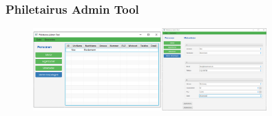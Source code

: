 \begin{frame}
\frametitle{Philetairus Admin Tool}

\begin{figure}
  \includegraphics[width=0.8\textwidth]{figures/phileadmin_workflow.png}
  \label{fig:phileadmin}
\end{figure}

\end{frame}





